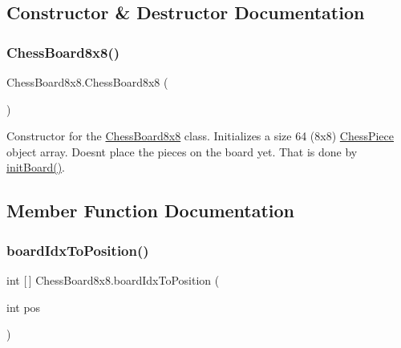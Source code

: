 \subsection{Constructor \& Destructor Documentation}
\mbox{\label{class_chess_board8x8_a808a23624fe757f342e7c49ebb73f9e6}} 
\subsubsection{\texorpdfstring{Chess\+Board8x8()}{ChessBoard8x8()}}
{\footnotesize\ttfamily Chess\+Board8x8.\+Chess\+Board8x8 (\begin{DoxyParamCaption}{ }\end{DoxyParamCaption})}

Constructor for the \mbox{\hyperlink{class_chess_board8x8}{Chess\+Board8x8}} class. Initializes a size 64 (8x8) \mbox{\hyperlink{class_chess_piece}{Chess\+Piece}} object array. Doesn\textquotesingle{}t place the pieces on the board yet. That is done by \mbox{\hyperlink{class_chess_board8x8_aaa6bdac1813e13604323507365a34e27}{init\+Board()}}. 

\subsection{Member Function Documentation}
\mbox{\label{class_chess_board8x8_a6a04078bf0064b2f144327bb7ac8c026}} 
\subsubsection{\texorpdfstring{board\+Idx\+To\+Position()}{boardIdxToPosition()}}
{\footnotesize\ttfamily int \mbox{[}$\,$\mbox{]} Chess\+Board8x8.\+board\+Idx\+To\+Position (\begin{DoxyParamCaption}\item[{int}]{pos }\end{DoxyParamCaption})\hspace{0.3cm}{\ttfamily [protected]}}

